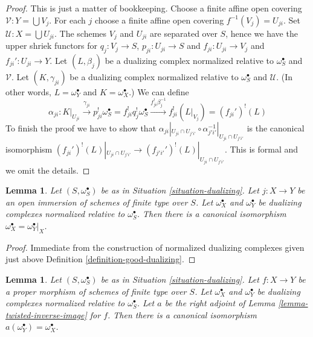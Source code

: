 \documentclass{stacks-project}
\theoremstyle{plain}
\newtheorem{lemma}[subsection]{Lemma}
\theoremstyle{definition}
\theoremstyle{remark}
\numberwithin{equation}{subsection}
\begin{document}
\begin{proof}
This is just a matter of bookkeeping.
Choose a finite affine open covering $\mathcal{V} : Y = \bigcup V_j$.
For each $j$ choose a finite affine open covering $f^{-1}(V_j) = U_{ji}$.
Set $\mathcal{U} : X = \bigcup U_{ji}$. The schemes $V_j$ and $U_{ji}$ are
separated over $S$, hence we have the upper shriek functors for
$q_j : V_j \to S$, $p_{ji} : U_{ji} \to S$ and
$f_{ji} : U_{ji} \to V_j$ and $f_{ji}' : U_{ji} \to Y$.
Let $(L, \beta_j)$ be a dualizing complex normalized relative to
$\omega_S^\bullet$ and $\mathcal{V}$.
Let $(K, \gamma_{ji})$ be a dualizing complex normalized relative to
$\omega_S^\bullet$ and $\mathcal{U}$.
(In other words, $L = \omega_Y^\bullet$ and $K = \omega_X^\bullet$.)
We can define
$$
\alpha_{ji} :
K|_{U_{ji}} \xrightarrow{\gamma_{ji}}
p_{ji}^!\omega_S^\bullet = f_{ji}^!q_j^!\omega_S^\bullet
\xrightarrow{f_{ji}^!\beta_j^{-1}} f_{ji}^!(L|_{V_j}) =
(f_{ji}')^!(L)
$$
To finish the proof we have to show that
$\alpha_{ji}|_{U_{ji} \cap U_{j'i'}}
\circ \alpha_{j'i'}^{-1}|_{U_{ji} \cap U_{j'i'}}$
is the canonical isomorphism
$(f_{ji}')^!(L)|_{U_{ji} \cap U_{j'i'}} \to
(f_{j'i'}')^!(L)|_{U_{ji} \cap U_{j'i'}}$. This is formal and we
omit the details.
\end{proof}

\begin{lemma}
\label{lemma-open-immersion-good-dualizing-complex}
Let $(S, \omega_S^\bullet)$ be as in Situation \ref{situation-dualizing}.
Let $j : X \to Y$ be an open immersion of schemes of finite type over $S$.
Let $\omega_X^\bullet$ and $\omega_Y^\bullet$ be dualizing complexes
normalized relative to $\omega_S^\bullet$. Then there is a canonical
isomorphism $\omega_X^\bullet = \omega_Y^\bullet|_X$.
\end{lemma}

\begin{proof}
Immediate from the construction of normalized dualizing complexes
given just above
Definition \ref{definition-good-dualizing}.
\end{proof}

\begin{lemma}
\label{lemma-proper-map-good-dualizing-complex}
Let $(S, \omega_S^\bullet)$ be as in Situation \ref{situation-dualizing}.
Let $f : X \to Y$ be a proper morphism of schemes of finite type over $S$.
Let $\omega_X^\bullet$ and $\omega_Y^\bullet$ be dualizing complexes
normalized relative to $\omega_S^\bullet$. Let $a$ be the
right adjoint of Lemma \ref{lemma-twisted-inverse-image} for
$f$. Then there is a canonical isomorphism
$a(\omega_Y^\bullet) = \omega_X^\bullet$.
\end{lemma}
\end{document}

